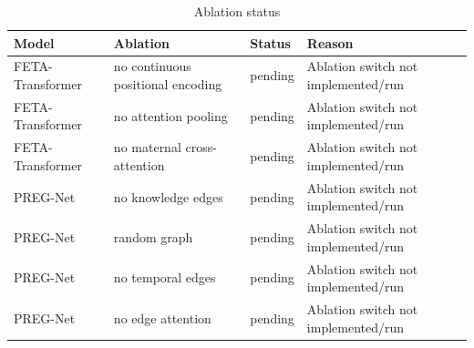\begin{table}[ht]
\centering
\caption{Ablation status}
\label{tab:ablation-status}
\begin{tabular}{llll}
\hline
Model & Ablation & Status & Reason \\
\hline
FETA-Transformer & no continuous positional encoding & pending & Ablation switch not implemented/run \\
FETA-Transformer & no attention pooling & pending & Ablation switch not implemented/run \\
FETA-Transformer & no maternal cross-attention & pending & Ablation switch not implemented/run \\
PREG-Net & no knowledge edges & pending & Ablation switch not implemented/run \\
PREG-Net & random graph & pending & Ablation switch not implemented/run \\
PREG-Net & no temporal edges & pending & Ablation switch not implemented/run \\
PREG-Net & no edge attention & pending & Ablation switch not implemented/run \\
\hline
\end{tabular}
\end{table}
